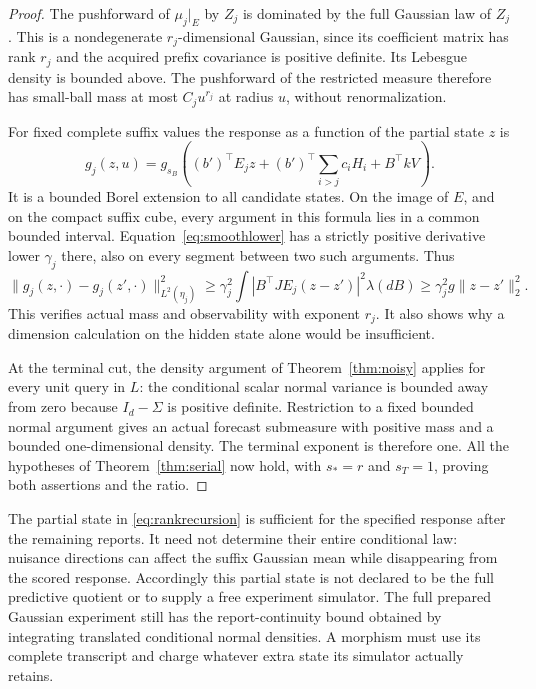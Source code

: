 \begin{proof}
The pushforward of $\mu_j|_E$ by $Z_j$ is dominated by the full Gaussian law of $Z_j$. This is a nondegenerate $r_j$-dimensional Gaussian, since its coefficient matrix has rank $r_j$ and the acquired prefix covariance is positive definite. Its Lebesgue density is bounded above. The pushforward of the restricted measure therefore has small-ball mass at most $C_j u^{r_j}$ at radius $u$, without renormalization.

For fixed complete suffix values the response as a function of the partial state $z$ is
\[
 g_j(z,u)=g_{s_B}\left((b')^\top E_jz+
                  (b')^\top\sum_{i>j}c_iH_i+B^\top kV\right).
\]
It is a bounded Borel extension to all candidate states. On the image of $E$, and on the compact suffix cube, every argument in this formula lies in a common bounded interval. Equation~\eqref{eq:smoothlower} has a strictly positive derivative lower $\gamma_j$ there, also on every segment between two such arguments. Thus
\[
 \|g_j(z,\cdot)-g_j(z',\cdot)\|_{L^2(\eta_j)}^2
 \ge\gamma_j^2\int |B^\top J E_j(z-z')|^2\lambda(dB)
 \ge\gamma_j^2g\|z-z'\|_2^2.
\]
This verifies actual mass and observability with exponent $r_j$. It also shows why a dimension calculation on the hidden state alone would be insufficient.

At the terminal cut, the density argument of Theorem~\ref{thm:noisy} applies for every unit query in $L$: the conditional scalar normal variance is bounded away from zero because $I_d-\Sigma$ is positive definite. Restriction to a fixed bounded normal argument gives an actual forecast submeasure with positive mass and a bounded one-dimensional density. The terminal exponent is therefore one. All the hypotheses of Theorem~\ref{thm:serial} now hold, with $s_*=r$ and $s_T=1$, proving both assertions and the ratio.
\end{proof}

The partial state in \eqref{eq:rankrecursion} is sufficient for the specified response after the remaining reports. It need not determine their entire conditional law: nuisance directions can affect the suffix Gaussian mean while disappearing from the scored response. Accordingly this partial state is not declared to be the full predictive quotient or to supply a free experiment simulator. The full prepared Gaussian experiment still has the report-continuity bound obtained by integrating translated conditional normal densities. A morphism must use its complete transcript and charge whatever extra state its simulator actually retains.

